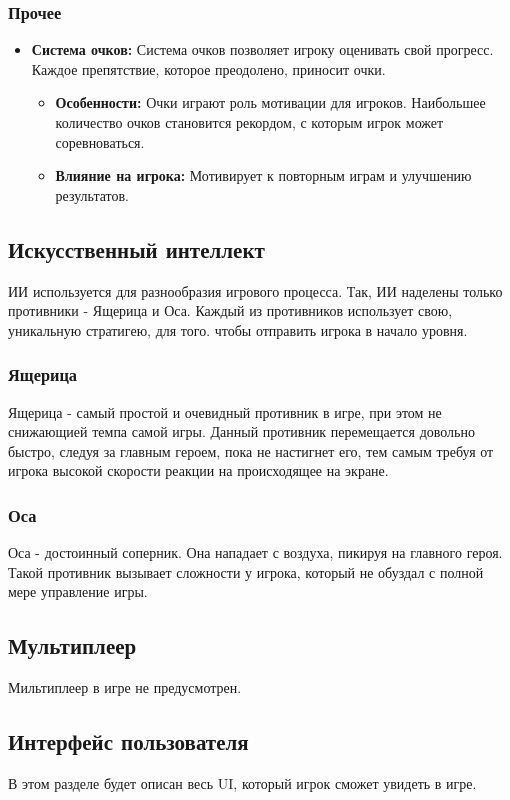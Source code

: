 \documentclass{article}
\begin{document}
\subsubsection{Прочее}
\begin{itemize}
    \item \textbf{Система очков:} Система очков позволяет игроку оценивать свой прогресс. Каждое препятствие, которое преодолено, приносит очки.
    \begin{itemize}
        \item \textbf{Особенности:} Очки играют роль мотивации для игроков. Наибольшее количество очков становится рекордом, с которым игрок может соревноваться.
        \item \textbf{Влияние на игрока:} Мотивирует к повторным играм и улучшению результатов.
    \end{itemize}
\end{itemize}

\subsection{Искусственный интеллект}
ИИ используется для разнообразия игрового процесса. Так, ИИ наделены только противники - Ящерица и Оса. Каждый из противников использует свою, уникальную стратигею, для того. чтобы отправить игрока в начало уровня.
\subsubsection{Ящерица}
Ящерица - самый простой и очевидный противник в игре, при этом не снижающией темпа самой игры. Данный противник перемещается довольно быстро, следуя за главным героем, пока не настигнет его, тем самым требуя от игрока высокой скорости реакции на происходящее на экране.
\subsubsection{Оса}
Оса - достоинный соперник. Она нападает с воздуха, пикируя на главного героя. Такой противник вызывает сложности у игрока, который не обуздал с полной мере управление игры.

\subsection{Мультиплеер}
Мильтиплеер в игре не предусмотрен.

\subsection{Интерфейс пользователя}
В этом разделе будет описан весь UI, который игрок сможет увидеть в игре.
\end{document}
